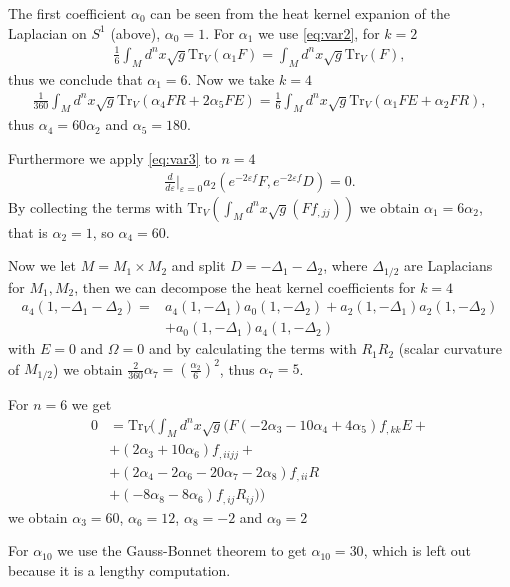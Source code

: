 The first coefficient $\alpha_0$ can be seen from the heat kernel expanion of
the Laplacian on $S^1$ (above), $\alpha_0 = 1$. For $\alpha_1$ we use
\ref{eq:var2}, for $k = 2$
\begin{align}
    \frac{1}{6} \int_M d^n x\sqrt{g} \text{Tr}_V(\alpha_1F) = \int_M d^n
    x\sqrt{g} \text{Tr}_V(F),
\end{align}
thus we conclude that $\alpha_1 = 6$. Now we take $k=4$
\begin{align}
    \frac{1}{360}\int_Md^n x \sqrt{g}\text{Tr}_V(\alpha_4 F R + 2\alpha_5 F E)
    = \frac{1}{6} \int_Md^n x\sqrt{g}\text{Tr}_V(\alpha_1 FE + \alpha_2 FR),
\end{align}
thus $\alpha_4 = 60\alpha_2$ and $\alpha_5 = 180$.

Furthermore we apply \ref{eq:var3} to $n=4$
\begin{align}
    \frac{d}{d\varepsilon}|_{\varepsilon=0} a_2(e^{-2\varepsilon f}F,
    e^{-2\varepsilon f}D) = 0.
\end{align}
By collecting the terms with $\text{Tr}_V(\int_Md^nx\sqrt{g}(Ff_{,jj}))$ we
obtain $\alpha_1 = 6\alpha_2$, that is $\alpha_2 = 1$, so $\alpha_4 = 60$.

Now we let $M=M_1\times M_2$ and split $D = -\Delta_1 -\Delta_2$, where
$\Delta_{1/2}$ are Laplacians for $M_1, M_2$, then we can decompose the heat
kernel coefficients for $k=4$
\begin{align}
    a_4(1,-\Delta_1-\Delta_2) =& a_4(1, -\Delta_1) a_0(1, -\Delta_2)
    +a_2(1,-\Delta_1) a_2(1,-\Delta_2) \\&+ a_0(1,-\Delta_1) a_4(1,-\Delta_2)
\end{align}
with $E=0$ and $\Omega =0$ and by calculating the terms with $R_1R_2$  (scalar
curvature of $M_{1/2}$) we obtain $\frac{2}{360}\alpha_7 =
(\frac{\alpha_2}{6})^2$, thus $\alpha_7 = 5$.

For $n=6$ we get
\begin{align}
    0 &= \text{Tr}_V(\int_Md^nx\sqrt{g}
    (F(-2\alpha_3-10\alpha_4+4\alpha_5)f_{,kk}E +\\
    &+(2\alpha_3 + 10\alpha_6)f_{,iijj}+\\
    &+(2\alpha_4 -2\alpha_6 - 20\alpha_7 -2\alpha_8)f_{,ii}R\\
    &+(-8\alpha_8 -8\alpha_6)f_{,ij}R_{ij}))
\end{align}
we obtain $\alpha_3 = 60$, $\alpha_6=12$, $\alpha_8 = -2$ and $\alpha_9 = 2$

For $\alpha_{10}$ we use the Gauss-Bonnet theorem to get $\alpha_{10}=30$,
which is left out because it is a lengthy computation.

